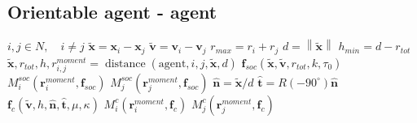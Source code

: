 \subsection{Orientable agent - agent}
\begin{algorithmic}[1]
\ENSURE $ i,j \in N, \quad i \neq j $
\STATE $ \tilde{\mathbf{x}} = \mathbf{x}_{i} - \mathbf{x}_{j} $
\STATE $ \tilde{\mathbf{v}} = \mathbf{v}_{i} - \mathbf{v}_{j} $
\STATE $ r_{max} = r_{i} + r_{j} $ 
\STATE $ d = \left\|\tilde{\mathbf{x}}\right\| $
\STATE $ h_{min} = d - r_{tot} $
\STATE 
{}
\STATE $ \tilde{\mathbf{x}}, r_{tot}, h, r_{i,j}^{moment} = \operatorname{distance}(\mathrm{agent}, i, j, \tilde{\mathbf{x}}, d) $
\STATE
{}
\STATE $ \mathbf{f}_{soc}(\tilde{\mathbf{x}}, \tilde{\mathbf{v}}, r_{tot}, k, \tau_{0}) $
\STATE $ M_{i}^{soc}(\mathbf{r}_{i}^{moment}, \mathbf{f}_{soc}) $
\STATE $ M_{j}^{soc}(\mathbf{r}_{j}^{moment}, \mathbf{f}_{soc}) $
\ENDIF
\STATE
{}
\STATE $ \hat{\mathbf{n}} = \tilde{\mathbf{x}} / d $
\STATE $ \hat{\mathbf{t}} = R(-90^{\circ}) \hat{\mathbf{n}} $
\STATE $ \mathbf{f}_{c}(\tilde{\mathbf{v}}, h, \hat{\mathbf{n}}, \hat{\mathbf{t}}, \mu, \kappa) $
\STATE $ M_{i}^{c}(\mathbf{r}_{i}^{moment}, \mathbf{f}_{c}) $
\STATE $ M_{j}^{c}(\mathbf{r}_{j}^{moment}, \mathbf{f}_{c}) $
\ENDIF
\ENDIF
\STATE $  $
\end{algorithmic}